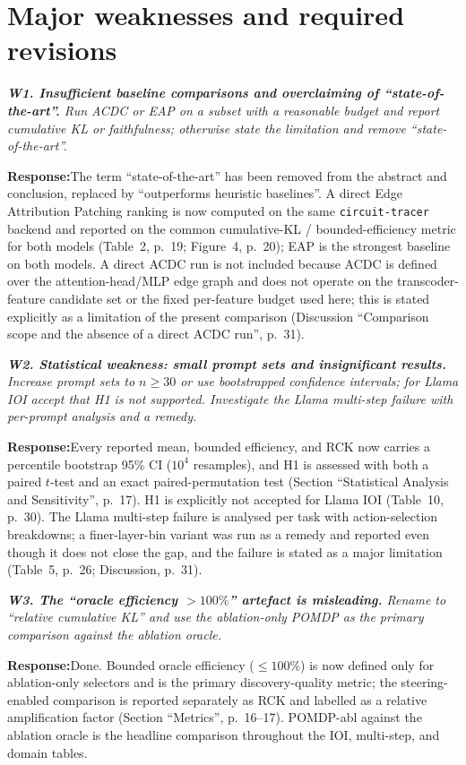 \documentclass[11pt]{article}
\newenvironment{comment}{%
  \def\FrameCommand{{\color{commentrule}\vrule width 3pt}\hspace{0pt}%
    \fboxsep=8pt\colorbox{commentbg}}%
  \MakeFramed{\advance\hsize-\width\FrameRestore}%
  \itshape\small}{\endMakeFramed}
\newcommand{\response}{\par\smallskip\noindent\textbf{Response:}\;}
\begin{document}
\section*{Major weaknesses and required revisions}

\begin{comment}
\textbf{W1. Insufficient baseline comparisons and overclaiming of
``state-of-the-art''.} Run ACDC or EAP on a subset with a reasonable budget and
report cumulative KL or faithfulness; otherwise state the limitation and remove
``state-of-the-art''.
\end{comment}
\response The term ``state-of-the-art'' has been removed from the abstract and
conclusion, replaced by ``outperforms heuristic baselines''. A direct Edge
Attribution Patching ranking is now computed on the same \texttt{circuit-tracer}
backend and reported on the common cumulative-KL / bounded-efficiency metric for
both models (Table~2, p.~19; Figure~4, p.~20); EAP is the strongest baseline on
both models. A direct ACDC run is not included because ACDC is defined over the
attention-head/MLP edge graph and does not operate on the transcoder-feature
candidate set or the fixed per-feature budget used here; this is stated explicitly
as a limitation of the present comparison (Discussion ``Comparison scope and the
absence of a direct ACDC run'', p.~31).

\begin{comment}
\textbf{W2. Statistical weakness: small prompt sets and insignificant results.}
Increase prompt sets to $n\geq30$ or use bootstrapped confidence intervals; for
Llama IOI accept that H1 is not supported. Investigate the Llama multi-step
failure with per-prompt analysis and a remedy.
\end{comment}
\response Every reported mean, bounded efficiency, and RCK now carries a
percentile bootstrap 95\% CI ($10^4$ resamples), and H1 is assessed with both a
paired $t$-test and an exact paired-permutation test
(Section ``Statistical Analysis and Sensitivity'', p.~17). H1 is explicitly not
accepted for Llama IOI (Table~10, p.~30). The Llama multi-step failure
is analysed per task with action-selection breakdowns; a finer-layer-bin variant
was run as a remedy and reported even though it does not close the gap, and the
failure is stated as a major limitation (Table~5, p.~26; Discussion, p.~31).

\begin{comment}
\textbf{W3. The ``oracle efficiency $>100\%$'' artefact is misleading.} Rename to
``relative cumulative KL'' and use the ablation-only POMDP as the primary
comparison against the ablation oracle.
\end{comment}
\response Done. Bounded oracle efficiency ($\leq100\%$) is now defined only for
ablation-only selectors and is the primary discovery-quality metric; the
steering-enabled comparison is reported separately as RCK and labelled as a
relative amplification factor (Section ``Metrics'', p.~16--17). POMDP-abl against
the ablation oracle is the headline comparison throughout the IOI, multi-step, and
domain tables.
\end{document}
